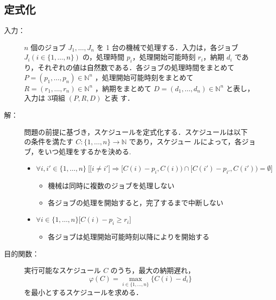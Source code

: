 \documentclass[12pt]{optlab-bachelor}
\begin{document}
\subsection{定式化}
\begin{description}
  \item[入力：] $n$ 個のジョブ $J_1,\ldots,J_n$ を 1 台の機械で処理する．入力は，各ジョブ $J_i ( i \in \{1,\ldots,n\} )$ の，処理時間 $p_i$，処理開始可能時刻
  $r_i$，納期 $d_i$ であり，それぞれの値は自然数である．各ジョブの処理時間をまとめて $P =
  (p_1,\ldots,p_n) \in \mathbb{N}^n$ ，処理開始可能時刻をまとめて $R =
  (r_1,\ldots,r_n) \in \mathbb{N}^n$ ，納期をまとめて $D =
  (d_1,\ldots,d_n) \in \mathbb{N}^n$ と表し，入力は 3項組 $(P,R,D)$ と表
  す．
  \item[解：] 問題の前提に基づき，スケジュールを定式化する．スケジュールは以下
  の条件を満たす $C : \{1,\ldots,n\} \to \mathbb{N}$ であり，スケジュー
  ルによって，各ジョブ，をいつ処理をするかを決める.
  \begin{itemize}
    \item $\forall i, i' \in \{1,\ldots,n\}\ \Big[ \big[i \neq i' \big] \Rightarrow [C(i) - p_i, C(i)) \cap [C(i') - p_{i'}, C(i')) = \emptyset \Big]$
    \begin{itemize}
      \item 機械は同時に複数のジョブを処理しない
      \item 各ジョブの処理を開始すると，完了するまで中断しない
    \end{itemize}
    \item  $\forall i \in \{1,\ldots,n\}\big[C(i) - p_i \ge r_i\big]$
    \begin{itemize}
      \item 各ジョブは処理開始可能時刻以降によりを開始する
    \end{itemize}
  \end{itemize}
  \item[目的関数：] 実行可能なスケジュール $C$ のうち，最大の納期遅れ，
  $$\displaystyle \varphi(C) = \max_{i \in \{1,\ldots,n\}}\{C(i) - d_i\}$$
  を最小とするスケジュールを求める．
\end{description}
\end{document}
